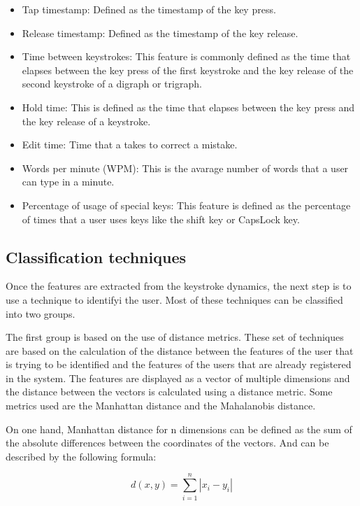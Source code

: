 \begin{itemize}
	\item Tap timestamp: Defined as the timestamp of the key press.
	\item Release timestamp: Defined as the timestamp of the key release.
	\item Time between keystrokes: This feature is commonly defined as the time that elapses between the key press of the first keystroke and the key release of the second keystroke of a digraph or trigraph.
	\item Hold time: This is defined as the time that elapses between the key press and the key release of a keystroke.
	\item Edit time: Time that a takes to correct a mistake.
	\item Words per minute (WPM): This is the avarage number of words that a user can type in a minute.
	\item Percentage of usage of special keys: This feature is defined as the percentage of times that a user uses keys like the shift key or CapsLock key.
\end{itemize}

\subsection{Classification techniques}

Once the features are extracted from the keystroke dynamics, the next step is to use a technique to identifyi the user. Most of these techniques can be classified into two groups.


The first group is based on the use of distance metrics. These set of techniques are based on the calculation of the distance between the features of the user that is trying to be identified and the features of the users that are already registered in the system. The features are displayed as a vector of multiple dimensions and the distance between the vectors is calculated using a distance metric. Some metrics used are the Manhattan distance and the Mahalanobis distance.

On one hand, Manhattan distance for n dimensions can be defined as the sum of the absolute differences between the coordinates of the vectors. And can be described by the following formula:

\begin{equation}
	d(x,y) = \sum_{i=1}^{n} |x_i - y_i|
\end{equation}

